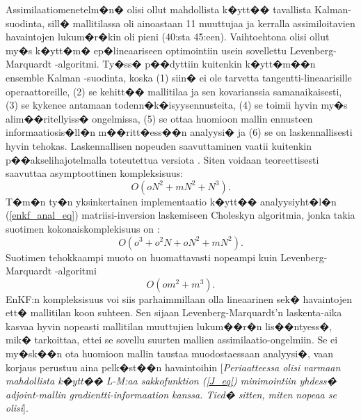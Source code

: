 \documentclass[12pt,a4paper,finnish,margin=2in]{article}
\begin{document}
Assimilaatiomenetelm�n� olisi ollut mahdollista k�ytt�� tavallista Kalman-suodinta, sill� mallitilassa oli ainoastaan 11 muuttujaa ja kerralla assimiloitavien havaintojen lukum�r�kin oli pieni (40:sta 45:een). Vaihtoehtona olisi ollut my�s \citet{doornbos_2008} k�ytt�m� ep�lineaariseen optimointiin usein sovellettu Levenberg-Marquardt -algoritmi. Ty�ss� p��dyttiin kuitenkin k�ytt�m��n ensemble Kalman -suodinta, koska (1) siin� ei ole tarvetta tangentti-lineaarisille operaattoreille, (2) se kehitt�� mallitilaa ja sen kovarianssia samanaikaisesti, (3) se kykenee antamaan todenn�k�isyysennusteita, (4) se toimii hyvin my�s alim��ritellyiss� ongelmissa, (5) se ottaa huomioon mallin ennusteen informaatiosis�ll�n m��ritt�ess��n analyysi� ja (6) se on laskennallisesti hyvin tehokas. Laskennallisen nopeuden saavuttaminen vaatii kuitenkin p��akselihajotelmalla toteutettua versiota \citep{mandel_2006}. Siten voidaan teoreettisesti saavuttaa asymptoottinen kompleksisuus:
\begin{equation} \label{svdCompl_eq}
O(oN^2 + mN^2 + N^3).
\end{equation}
T�m�n ty�n yksinkertainen implementaatio k�ytt�� analyysiyht�l�n (\ref{enkf_anal_eq}) matriisi-inversion laskemiseen Choleskyn algoritmia, jonka takia suotimen kokonaiskomplekisuus on \citep{mandel_2006}:
\begin{equation} \label{naiveCompl_eq}
O(o^3 + o^2N + oN^2 + mN^2).
\end{equation}
Suotimen tehokkaampi muoto on huomattavasti nopeampi kuin Levenberg-Marquardt -algoritmi \citep{more_1978}
\begin{equation} \label{lm_eq}
O(om^2 + m^3).
\end{equation}
EnKF:n kompleksisuus voi siis parhaimmillaan olla lineaarinen sek� havaintojen ett� mallitilan koon suhteen. Sen sijaan Levenberg-Marquardt'n laskenta-aika kasvaa hyvin nopeasti mallitilan muuttujien lukum��r�n lis��ntyess�, mik� tarkoittaa, ettei se sovellu suurten mallien assimilaatio-ongelmiin. Se ei my�sk��n ota huomioon mallin taustaa muodostaessaan analyysi�, vaan korjaus perustuu aina pelk�st��n havaintoihin [\textit{Periaatteessa olisi varmaan mahdollista k�ytt�� L-M:aa sakkofunktion (\ref{J_eq}) minimointiin yhdess� adjoint-mallin gradientti-informaation kanssa. Tied� sitten, miten nopeaa se olisi}]. 
\end{document}
